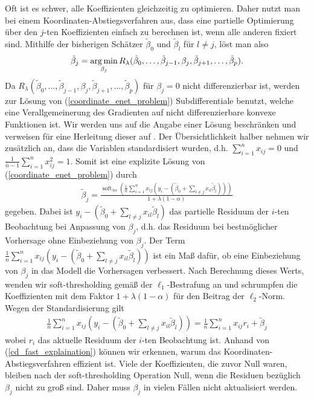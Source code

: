 Oft ist es schwer, alle Koeffizienten gleichzeitig zu optimieren. Daher nutzt man bei einem Koordinaten-Abstiegsverfahren aus, dass eine partielle Optimierung über den $j$-ten Koeffizienten einfach zu berechnen ist, wenn alle anderen fixiert sind. Mithilfe der bisherigen Schätzer $\tilde{\beta}_0$ und $\tilde{\beta}_l$ für $l \neq j$, löst man also
\begin{align}
\label{coordinate_enet_problem}
\tilde{\beta}_j = \operatorname*{arg\,min}_{\beta_j} R_{\lambda}(\tilde{\beta}_0, \ldots, \tilde{\beta}_{j-1}, \beta_j, \tilde{\beta}_{j+1}, \ldots, \tilde{\beta}_p).
\end{align}
Da $R_{\lambda}(\tilde{\beta}_0, \ldots, \tilde{\beta}_{j-1}, \beta_j, \tilde{\beta}_{j+1}, \ldots, \tilde{\beta}_p)$ für $\beta_j = 0$ nicht differenzierbar ist, werden zur Lösung von (\ref{coordinate_enet_problem}) Subdifferentiale benutzt, welche eine Verallgemeinerung des Gradienten auf nicht differenzierbare konvexe Funktionen ist. Wir werden uns auf die Angabe einer Lösung beschränken und verweisen für eine Herleitung dieser auf \cite{donoho}. Der Übersichtlichkeit halber nehmen wir zusätzlich an, dass die Variablen standardisiert wurden, d.h. $\sum_{i=1}^n x_{ij} = 0$ und $\frac{1}{n-1}\sum_{i=1}^n x_{ij}^2 = 1$. Somit ist eine explizite Lösung von (\ref{coordinate_enet_problem}) durch
\begin{align}
\tilde{\beta}_j = \frac{\operatorname{soft}_{\lambda\alpha} (\frac{1}{n}\sum_{i=1}^n x_{ij}(y_i - (\tilde{\beta}_0 + \sum_{l \neq j} x_{il}\tilde{\beta}_l)))}{1 + \lambda (1-\alpha)}
\end{align}
gegeben. Dabei ist $y_i - (\tilde{\beta}_0 + \sum_{l \neq j} x_{il}\tilde{\beta}_l)$ das partielle Residuum der $i$-ten Beobachtung bei Anpassung von $\beta_j$, d.h. das Residuum bei bestmöglicher Vorhersage ohne Einbeziehung von $\beta_j$. Der Term $\frac{1}{n}\sum_{i=1}^n x_{ij}(y_i - (\tilde{\beta}_0 + \sum_{l \neq j} x_{il}\tilde{\beta}_l))$ ist ein Maß dafür, ob eine Einbeziehung von $\beta_j$ in das Modell die Vorhersagen verbessert. Nach Berechnung dieses Werts, wenden wir soft-thresholding gemäß der $\ell_1$-Bestrafung an und schrumpfen die Koeffizienten mit dem Faktor $1+\lambda(1-\alpha)$ für den Beitrag der $\ell_2$-Norm. Wegen der Standardisierung gilt
\begin{align}
\label{cd_fast_explaination}
\frac{1}{n}\sum_{i=1}^n x_{ij}(y_i - (\tilde{\beta}_0 + \sum_{l \neq j} x_{il}\tilde{\beta}_l)) = \frac{1}{n}\sum_{i=1}^n x_{ij}r_i + \tilde{\beta}_j
\end{align}
wobei $r_i$ das aktuelle Residuum der $i$-ten Beobachtung ist. Anhand von (\ref{cd_fast_explaination}) können wir erkennen, warum das Koordinaten-Abstiegsverfahren effizient ist. Viele der Koeffizienten, die zuvor Null waren, bleiben nach der soft-thresholding Operation Null, wenn die Residuen bezüglich $\beta_j$ nicht zu groß sind. Daher muss $\beta_j$ in vielen Fällen nicht aktualisiert werden.


